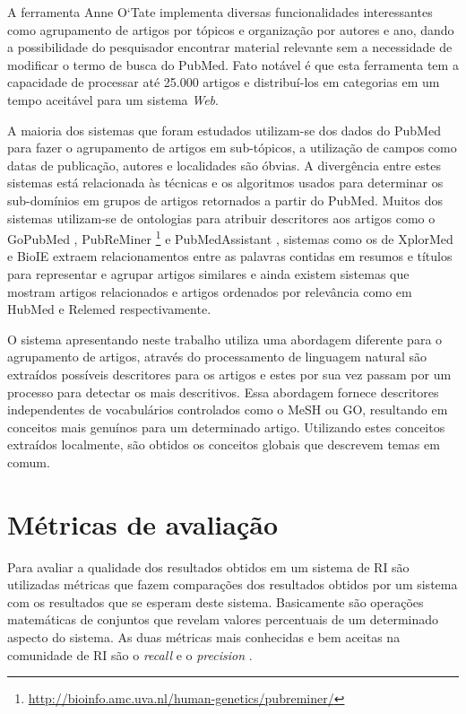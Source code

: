 A ferramenta Anne O`Tate implementa diversas funcionalidades interessantes como agrupamento de artigos por tópicos e organização por autores e ano, dando a possibilidade do pesquisador encontrar material relevante sem a necessidade de modificar o termo de busca do PubMed. Fato notável é que esta ferramenta tem a capacidade de processar até 25.000 artigos e distribuí-los em categorias em um tempo aceitável para um sistema \emph{Web}.

A maioria dos sistemas que foram estudados utilizam-se dos dados do PubMed para fazer o agrupamento de artigos em sub-tópicos, a utilização de campos como datas de publicação, autores e localidades são óbvias. A divergência entre estes sistemas está relacionada às técnicas e os algoritmos usados para determinar os sub-domínios em grupos de artigos retornados a partir do PubMed. Muitos dos sistemas utilizam-se de ontologias para atribuir descritores aos artigos como o GoPubMed \cite{Doms2005}, PubReMiner \footnote{\href{http://bioinfo.amc.uva.nl/human-genetics/pubreminer/}{http://bioinfo.amc.uva.nl/human-genetics/pubreminer/}} e PubMedAssistant \cite{Ding2006}, sistemas como os de  XplorMed \cite{Perez-Iratxeta2001} e BioIE \cite{Divoli2005} extraem relacionamentos entre as palavras contidas em resumos e títulos para representar e agrupar artigos similares e ainda existem sistemas que mostram artigos relacionados e artigos ordenados por relevância como em HubMed \cite{Eaton2006} e Relemed \cite{Siadaty2007} respectivamente.

O sistema apresentando neste trabalho utiliza uma abordagem diferente para o agrupamento de artigos, através do processamento de linguagem natural são extraídos possíveis descritores para os artigos e estes por sua vez passam por um processo para detectar os mais descritivos. Essa abordagem fornece descritores independentes de vocabulários controlados como o MeSH ou GO, resultando em conceitos mais genuínos para um determinado artigo. Utilizando estes conceitos extraídos localmente, são obtidos os conceitos globais que descrevem temas em comum.

\section{Métricas de avaliação}
Para avaliar a qualidade dos resultados obtidos em um sistema de RI são utilizadas métricas que fazem comparações dos resultados obtidos por um sistema com os resultados que se esperam deste sistema. Basicamente são operações matemáticas de conjuntos que revelam valores percentuais de um determinado aspecto do sistema. As duas métricas mais conhecidas e bem aceitas na comunidade de RI são o \emph{recall} e o \emph{precision} \cite{Turpin2006}.

